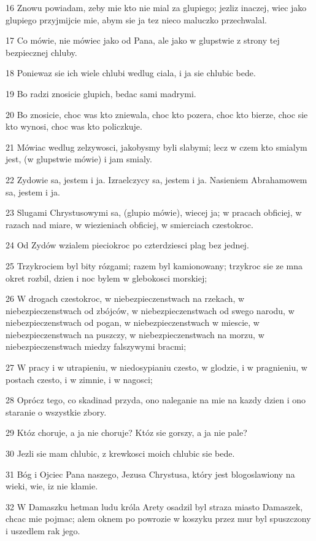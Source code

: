 \par 16 Znowu powiadam, zeby mie kto nie mial za glupiego; jezliz inaczej, wiec jako glupiego przyjmijcie mie, abym sie ja tez nieco maluczko przechwalal.
\par 17 Co mówie, nie mówiec jako od Pana, ale jako w glupstwie z strony tej bezpiecznej chluby.
\par 18 Poniewaz sie ich wiele chlubi wedlug ciala, i ja sie chlubic bede.
\par 19 Bo radzi znosicie glupich, bedac sami madrymi.
\par 20 Bo znosicie, choc was kto zniewala, choc kto pozera, choc kto bierze, choc sie kto wynosi, choc was kto policzkuje.
\par 21 Mówiac wedlug zelzywosci, jakobysmy byli slabymi; lecz w czem kto smialym jest, (w glupstwie mówie) i jam smialy.
\par 22 Zydowie sa, jestem i ja. Izraelczycy sa, jestem i ja. Nasieniem Abrahamowem sa, jestem i ja.
\par 23 Slugami Chrystusowymi sa, (glupio mówie), wiecej ja; w pracach obficiej, w razach nad miare, w wiezieniach obficiej, w smierciach czestokroc.
\par 24 Od Zydów wzialem pieciokroc po czterdziesci plag bez jednej.
\par 25 Trzykrociem byl bity rózgami; razem byl kamionowany; trzykroc sie ze mna okret rozbil, dzien i noc bylem w glebokosci morskiej;
\par 26 W drogach czestokroc, w niebezpieczenstwach na rzekach, w niebezpieczenstwach od zbójców, w niebezpieczenstwach od swego narodu, w niebezpieczenstwach od pogan, w niebezpieczenstwach w miescie, w niebezpieczenstwach na puszczy, w niebezpieczenstwach na morzu, w niebezpieczenstwach miedzy falszywymi bracmi;
\par 27 W pracy i w utrapieniu, w niedosypianiu czesto, w glodzie, i w pragnieniu, w postach czesto, i w zimnie, i w nagosci;
\par 28 Oprócz tego, co skadinad przyda, ono naleganie na mie na kazdy dzien i ono staranie o wszystkie zbory.
\par 29 Któz choruje, a ja nie choruje? Któz sie gorszy, a ja nie pale?
\par 30 Jezli sie mam chlubic, z krewkosci moich chlubic sie bede.
\par 31 Bóg i Ojciec Pana naszego, Jezusa Chrystusa, który jest blogoslawiony na wieki, wie, iz nie klamie.
\par 32 W Damaszku hetman ludu króla Arety osadzil byl straza miasto Damaszek, chcac mie pojmac; alem oknem po powrozie w koszyku przez mur byl spuszczony i uszedlem rak jego.

